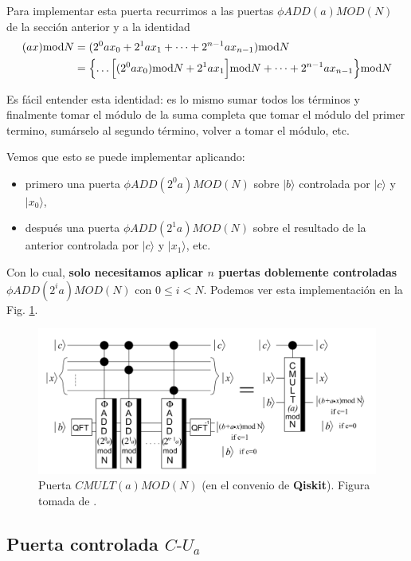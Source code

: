 \documentclass[a4paper,11pt]{book} %
\numberwithin{equation}{chapter}
\def\Lc{\Bigl[}
\def\Rc{\Bigr]}
\def\Lch{\Bigl\{}
\def\Rch{\Bigr\}}
\begin{document}
Para implementar esta puerta recurrimos a las puertas $\phi ADD(a)MOD(N)$ de la sección anterior y a la identidad
\begin{align*}
(ax) \text{mod} N & = (2^0 a x_0 + 2^1 a x_1 + \dots + 2^{n-1} a x_{n-1}) \text{mod} N \\
& = \Lch \dots \Lc (2^0 a x_0) \text{mod} N + 2^1 a x_1 \Rc \text{mod} N + \dots + 2^{n-1} a x_{n-1} \Rch \text{mod} N
\end{align*}

Es fácil entender esta identidad: es lo mismo sumar todos los términos y finalmente tomar el módulo de la suma completa que tomar el módulo del primer termino, sumárselo al segundo término, volver a tomar el módulo, etc. 

Vemos que esto se puede implementar aplicando:
\begin{itemize}
	\item  primero una puerta $\phi ADD(2^0 a) MOD(N)$ sobre $|b \rangle$ controlada por $|c \rangle$ y $| x_0 \rangle $,
	
	\item después una puerta $\phi ADD(2^1 a) MOD(N)$ sobre el resultado de la anterior controlada por $|c \rangle$ y $| x_1 \rangle$, etc.
\end{itemize}
Con lo cual, \textbf{solo necesitamos aplicar $n$ puertas doblemente controladas $\phi ADD (2^i a) MOD(N)$} con $0 \leq i < N$. Podemos ver esta implementación en la  Fig. \ref{Fig_idea_CMULT(a)MOD(N)}.


\begin{figure}[H]
\centering 
\includegraphics[width=0.9\linewidth]{Figuras/Fig-CMULT(a)MOD(N).png}
\caption{Puerta $CMULT(a)MOD(N)$ (en el convenio de \textbf{Qiskit}). Figura tomada de \cite{bib_2n+3}.}
\label{Fig_idea_CMULT(a)MOD(N)}
\end{figure}



\subsection{Puerta controlada $C\text{-}U_a$} \label{sec_2n+3-Puerta-C-U_a}
\end{document}
